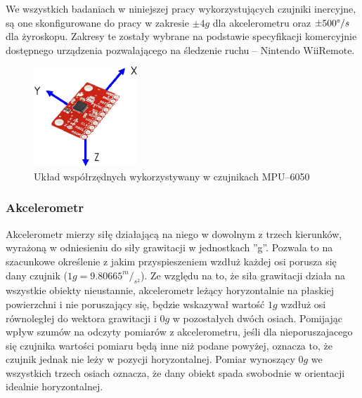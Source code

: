 We wszystkich badaniach w niniejszej pracy wykorzystujących czujniki inercyjne, są one skonfigurowane do pracy w zakresie  $\pm4g$ dla akcelerometru oraz $\pm500\degree/s$dla żyroskopu. Zakresy te zostały wybrane na podstawie specyfikacji komercyjnie dostępnego urządzenia pozwalającego na śledzenie ruchu -- Nintendo WiiRemote.
		
\begin{figure}[!htp]
	\centering 
	\includegraphics[width=0.35\textwidth]{images/imuCoordinationSpace.eps}	
	\caption{Układ współrzędnych wykorzystywany w czujnikach MPU--6050}
	\label{fig:characteristics:imu:space}
\end{figure}
		
		
\subsubsection*{Akcelerometr}
Akcelerometr mierzy siłę działającą na niego w dowolnym z trzech kierunków, wyrażoną w odniesieniu do siły grawitacji w jednostkach ''g''. Pozwala to na szacunkowe określenie z jakim przyspieszeniem wzdłuż każdej osi porusza się dany czujnik 
($1g =9.80665^m/_{s^2}$). Ze względu na to, że siła grawitacji działa na wszystkie obiekty nieustannie, akcelerometr leżący horyzontalnie na płaskiej powierzchni i nie poruszający się, będzie wskazywał wartość $1g$ wzdłuż osi równoległej do wektora grawitacji i $0g$ w pozostałych dwóch osiach. Pomijając wpływ szumów na odczyty pomiarów z akcelerometru, jeśli dla nieporuszajacego się czujnika wartości pomiaru będą inne niż podane powyżej, oznacza to, że czujnik jednak nie leży w pozycji horyzontalnej. Pomiar wynoszący $0g$ we wszystkich trzech osiach oznacza, że dany obiekt spada swobodnie w orientacji idealnie horyzontalnej.\\
		
